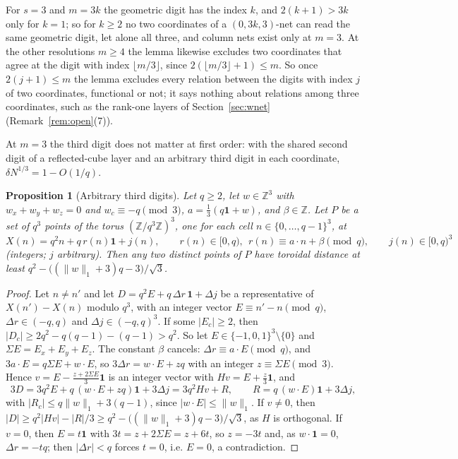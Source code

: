 \documentclass[11pt]{amsart}
\newtheorem{proposition}[theorem]{Proposition}
\theoremstyle{definition}
\theoremstyle{plain}
\newcommand{\Z}{\mathbb{Z}}
\begin{document}
For $s=3$ and $m=3k$ the geometric digit has the index $k$, and $2(k+1)>3k$ only for $k=1$; so for $k\ge2$ no two coordinates of a $(0,3k,3)$-net can read the same geometric digit, let alone all three, and column nets exist only at $m=3$. At the other resolutions $m\ge4$ the lemma likewise excludes two coordinates that agree at the digit with index $\lfloor m/3\rfloor$, since $2(\lfloor m/3\rfloor+1)\le m$. So once $2(j+1)\le m$ the lemma excludes every relation between the digits with index $j$ of two coordinates, functional or not; it says nothing about relations among three coordinates, such as the rank-one layers of Section~\ref{sec:wnet} (Remark~\ref{rem:open}(7)).

At $m=3$ the third digit does not matter at first order: with the shared second digit of a reflected-cube layer and an arbitrary third digit in each coordinate, $\delta N^{1/3}=1-O(1/q)$.

\begin{proposition}[Arbitrary third digits]\label{prop:colfree}
Let $q\ge2$, let $w\in\Z^3$ with $w_x+w_y+w_z=0$ and $w_c\equiv-q\pmod3$, $a=\frac13(q\mathbf 1+w)$, and $\beta\in\Z$. Let $P$ be a set of $q^3$ points of the torus $(\Z/q^3\Z)^3$, one for each cell $n\in\{0,\dots,q-1\}^3$, at
\[
X(n)=q^2n+q\,r(n)\mathbf 1+j(n),\qquad r(n)\in[0,q),\ \ r(n)\equiv a\cdot n+\beta\pmod q,\qquad j(n)\in[0,q)^3
\]
(integers; $j$ arbitrary). Then any two distinct points of $P$ have toroidal distance at least $q^2-\bigl((\|w\|_1+3)q-3\bigr)/\sqrt3$.
\end{proposition}

\begin{proof}
Let $n\ne n'$ and let $D=q^2E+q\,\Delta r\,\mathbf 1+\Delta j$ be a representative of $X(n')-X(n)$ modulo $q^3$, with an integer vector $E\equiv n'-n\pmod q$, $\Delta r\in(-q,q)$ and $\Delta j\in(-q,q)^3$. If some $|E_c|\ge2$, then $|D_c|\ge2q^2-q(q-1)-(q-1)>q^2$. So let $E\in\{-1,0,1\}^3\setminus\{0\}$ and $\Sigma E=E_x+E_y+E_z$. The constant $\beta$ cancels: $\Delta r\equiv a\cdot E\pmod q$, and $3a\cdot E=q\Sigma E+w\cdot E$, so $3\Delta r=w\cdot E+zq$ with an integer $z\equiv\Sigma E\pmod3$. Hence $v=E-\frac{z+2\Sigma E}3\mathbf 1$ is an integer vector with $Hv=E+\frac z3\mathbf 1$, and
\[
3D=3q^2E+q\,(w\cdot E+zq)\mathbf 1+3\Delta j=3q^2Hv+R,\qquad R=q\,(w\cdot E)\mathbf 1+3\Delta j,
\]
with $|R_c|\le q\|w\|_1+3(q-1)$, since $|w\cdot E|\le\|w\|_1$. If $v\ne0$, then $|D|\ge q^2|Hv|-|R|/3\ge q^2-\bigl((\|w\|_1+3)q-3\bigr)/\sqrt3$, as $H$ is orthogonal. If $v=0$, then $E=t\mathbf 1$ with $3t=z+2\Sigma E=z+6t$, so $z=-3t$ and, as $w\cdot\mathbf 1=0$, $\Delta r=-tq$; then $|\Delta r|<q$ forces $t=0$, i.e. $E=0$, a contradiction.
\end{proof}
\end{document}
